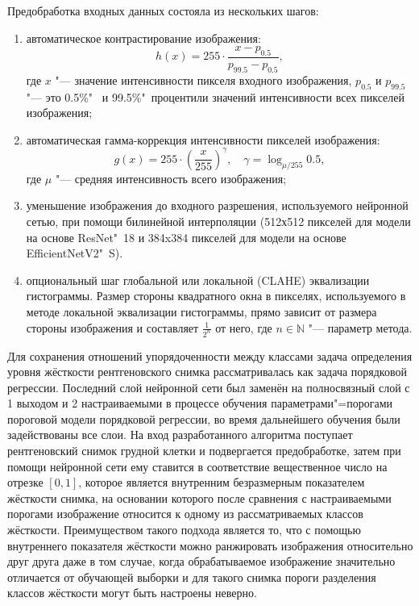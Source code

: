 Предобработка входных данных состояла из нескольких шагов:
\begin{enumerate}[beginpenalty=10000]
	\item автоматическое контрастирование изображения:
	\begin{equation}
		h \left( x \right) = 255 \cdot \frac{x - p_{0.5}}{p_{99.5} - p_{0.5}}, \nonumber
	\end{equation}
	где $x$ "--- значение интенсивности пикселя входного изображения, $p_{0.5}$ и $p_{99.5}$ "--- это 0.5\%"~ и 99.5\%"~процентили значений интенсивности всех пикселей изображения;
	\item автоматическая гамма-коррекция интенсивности пикселей изображения:
	\begin{equation}
		g \left( x \right) = 255 \cdot {\left( \frac{x}{255} \right)}^{\gamma}, \quad \gamma = \log_{\mu / 255}{0.5}, \nonumber
	\end{equation}
	где $\mu$ "--- средняя интенсивность всего изображения;
	\item уменьшение изображения до входного разрешения, используемого нейронной сетью, при помощи билинейной интерполяции (512х512 пикселей для модели на основе ResNet"~18 и 384x384 пикселей для модели на основе EfficientNetV2"~S).
	\item опциональный шаг глобальной или локальной (CLAHE) эквализации гистограммы. Размер стороны квадратного окна  в пикселях, используемого в методе локальной эквализации гистограммы, прямо зависит от размера стороны изображения и составляет $\frac{1}{2^n}$ от него, где $n\in\mathbb{N}$ "--- параметр метода.
\end{enumerate}

Для сохранения отношений упорядоченности между классами задача определения уровня жёсткости рентгеновского снимка рассматривалась как задача порядковой регрессии. Последний слой нейронной сети был заменён на полносвязный слой с 1 выходом и 2 настраиваемыми в процессе обучения параметрами"=порогами пороговой модели порядковой регрессии, во время дальнейшего обучения были задействованы все слои. На вход разработанного алгоритма поступает рентгеновский снимок грудной клетки и подвергается предобработке, затем при помощи нейронной сети ему ставится в соответствие вещественное число на отрезке $\left[0, 1\right]$, которое является внутренним безразмерным показателем жёсткости снимка, на основании которого после сравнения с настраиваемыми порогами изображение относится к одному из рассматриваемых классов жёсткости. Преимуществом такого подхода является то, что с помощью внутреннего показателя жёсткости можно ранжировать изображения относительно друг друга даже в том случае, когда обрабатываемое изображение значительно отличается от обучающей выборки и для такого снимка пороги разделения классов жёсткости могут быть настроены неверно.

